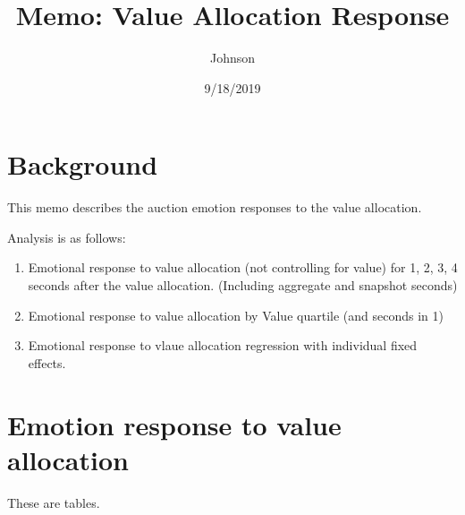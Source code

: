 \documentclass[]{article}
\title{Memo: Value Allocation Response}
\author{Johnson}
\date{9/18/2019}
\providecommand{\tightlist}{%
  \setlength{\itemsep}{0pt}\setlength{\parskip}{0pt}}
\begin{document}
\maketitle

\hypertarget{background}{%
\section{Background}\label{background}}

This memo describes the auction emotion responses to the value
allocation.

Analysis is as follows:

\begin{enumerate}
\def\labelenumi{\arabic{enumi}.}
\tightlist
\item
  Emotional response to value allocation (not controlling for value) for
  1, 2, 3, 4 seconds after the value allocation. (Including aggregate
  and snapshot seconds)
\item
  Emotional response to value allocation by Value quartile (and seconds
  in 1)
\item
  Emotional response to vlaue allocation regression with individual
  fixed effects.
\end{enumerate}

\hypertarget{emotion-response-to-value-allocation}{%
\section{Emotion response to value
allocation}\label{emotion-response-to-value-allocation}}

These are tables.
\end{document}
